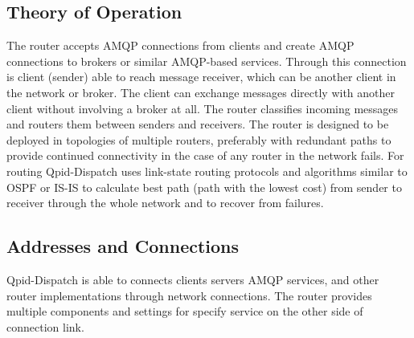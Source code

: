 \subsection{Theory of Operation}
The router accepts AMQP connections from clients and create AMQP connections to brokers or similar AMQP-based services. Through this connection is client (sender) able to reach message receiver, which can be another client in the network or broker. The client can  exchange messages directly with another client without involving a broker at all. The router classifies incoming messages and routers them between senders and receivers. The router is designed to be deployed in topologies of multiple routers, preferably with redundant paths to provide continued connectivity in the case of any router in the network fails. For routing Qpid-Dispatch uses link-state routing protocols \footnotemark and algorithms similar to OSPF or IS-IS to calculate best path (path with the lowest cost) from sender to receiver through the whole network and to recover from failures. 


\subsection{Addresses and Connections}
\label{Addresses and Connections}
Qpid-Dispatch is able to connects clients servers AMQP services, and other router implementations through network connections. The router provides multiple components and settings for specify service on the other side of connection link. 


